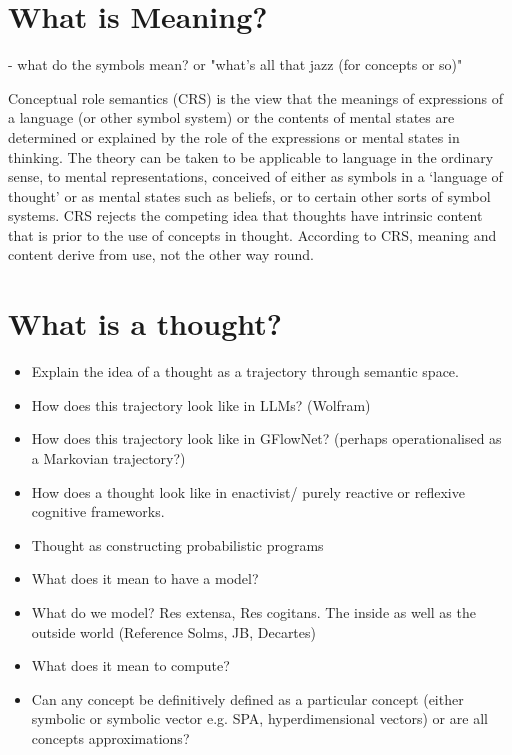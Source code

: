 \section{What is Meaning?}
- what do the symbols mean? or "what's all that jazz (for concepts or so)"




Conceptual role semantics (CRS) is the view that the meanings of expressions of a language (or other symbol system) or the contents of mental states are determined or explained by the role of the expressions or mental states in thinking. The theory can be taken to be applicable to language in the ordinary sense, to mental representations, conceived of either as symbols in a ‘language of thought’ or as mental states such as beliefs, or to certain other sorts of symbol systems. CRS rejects the competing idea that thoughts have intrinsic content that is prior to the use of concepts in thought. According to CRS, meaning and content derive from use, not the other way round.






\section{What is a thought?}
\begin{itemize}
    \item Explain the idea of a thought as a trajectory through semantic space. 
    \item How does this trajectory look like in LLMs? (Wolfram)
    \item How does this trajectory look like in GFlowNet? (perhaps operationalised as a Markovian trajectory?)
    \item How does a thought look like in enactivist/ purely reactive or reflexive cognitive frameworks. 
    \item Thought as constructing probabilistic programs
    \item What does it mean to have a model?
    \item What do we model? Res extensa, Res cogitans. The inside as well as the outside world (Reference Solms, JB, Decartes)
    \item What does it mean to compute?
    \item Can any concept be definitively defined as a particular concept (either symbolic or symbolic vector e.g. SPA, hyperdimensional vectors) or are all concepts approximations?
\end{itemize}


















